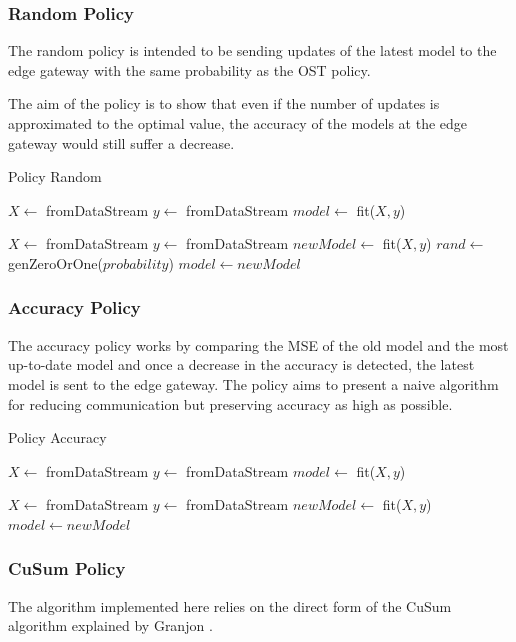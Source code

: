 \documentclass{mpaper}
\begin{document}
\subsubsection{Random Policy}
The random policy is intended to be sending updates of the latest model to the edge gateway with the same probability as the OST policy.

The aim of the policy is to show that even if the number of updates is approximated to the optimal value, the accuracy of the models at the edge gateway would still suffer a decrease.

\begin{algorithm}[h]
\caption{Policy Random}\label{polR}
\begin{algorithmic}
\State $X \gets$ fromDataStream
\State $y \gets$ fromDataStream
\State $model \gets$ fit($X,y$)

    \State $X \gets$ fromDataStream
    \State $y \gets$ fromDataStream
    \State $newModel \gets$ fit($X,y$)
    \State $rand \gets$ genZeroOrOne($probability$)
        \State $model \gets newModel$ 
    \EndIf
\EndWhile
\end{algorithmic}
\end{algorithm}

\subsubsection{Accuracy Policy}
The accuracy policy works by comparing the MSE of the old model and the most up-to-date model and once a decrease in the accuracy is detected, the latest model is sent to the edge gateway.
The policy aims to present a naive algorithm for reducing communication but preserving accuracy as high as possible.

\begin{algorithm}[h]
\caption{Policy Accuracy}\label{polA}
\begin{algorithmic}
\State $X \gets$ fromDataStream
\State $y \gets$ fromDataStream
\State $model \gets$ fit($X,y$)

    \State $X \gets$ fromDataStream
    \State $y \gets$ fromDataStream
    \State $newModel \gets$ fit($X,y$)
        \State $model \gets newModel$ 
    \EndIf
\EndWhile
\end{algorithmic}
\end{algorithm}

\subsubsection{CuSum Policy}
The algorithm implemented here relies on the direct form of the CuSum algorithm explained by Granjon \cite{cusum_pierre}.
\end{document}
